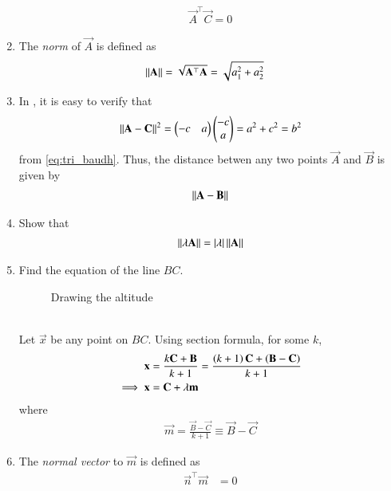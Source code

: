 \begin{enumerate}[label=\thesection.\arabic*.,ref=\thesection.\theenumi]
\begin{align}
  \label{eq:dot2d-orth}
  \vec{A}^{\top} \vec{C}  = 0
\end{align}
\item The {\em norm} of $\vec{A}$ is defined as
\begin{align}
  \label{eq:norm2d}
	\left\lVert\mathbf{A}\right\rVert 
  &= \sqrt{\mathbf{A}^{\top} \mathbf{A}}= \sqrt{a_1^2+a_2^2}
\end{align}
\item In 
,	
it is easy to verify that 
\begin{align}
\left\lVert\mathbf{A}-\mathbf{C}\right\rVert^2  
  = \begin{pmatrix}-c & a\end{pmatrix} \begin{pmatrix}-c \\ a\end{pmatrix}
= a^2 + c^2 = b^2
\end{align}
from 
	\eqref{eq:tri_baudh}.
Thus, 
	the distance betwen any two  points $\vec{A}$ and $\vec{B}$ is given by 
\begin{align}
  \label{eq:norm2d_dist}
\left\lVert\mathbf{A}-\mathbf{B}\right\rVert 
\end{align}
\item Show that 
\begin{align}
  \label{eq:norm2d_const}
  \left\lVert\lambda \mathbf{A}\right\rVert 
  = \left\vert\lambda\right\vert \left\lVert\mathbf{A}\right\rVert
\end{align}
\item Find the equation of the line $BC$.
%
\begin{figure}[!ht]
	\begin{center}
		\resizebox{\columnwidth}{!}{}
	\end{center}
	\caption{Drawing the altitude}
	\label{fig:tri_alt}	
\end{figure}
\\
\solution Let $\vec{x}$ be any point on $BC$.  Using section formula, for some $k$, 
%
\begin{align}
\mathbf{x} &= \frac{k\mathbf{C}+\mathbf{B}}{k+1} = \frac{\left(k+1\right)\mathbf{C}+\left(\mathbf{B}-\mathbf{C}\right)}{k+1}
\\
\implies \mathbf{x} &= \mathbf{C} + \lambda \mathbf{m}
\label{eq:line_dir_pt}
\end{align}
%
where 
%
\begin{align}
\vec{m} 
 = \frac{\vec{B}-\vec{C}}{k+1} \equiv \vec{B}-\vec{C}
\label{eq:line_dir_pt-alt}
\end{align}
%
\item The {\em normal vector} to $\vec{m}$ is defined as
%
\begin{align}
\label{eq:dir_normal_orth}
\vec{n}^{\top}\vec{m} &= 0
\end{align}
%
%
\begin{align}

\end{align}
\end{enumerate}
